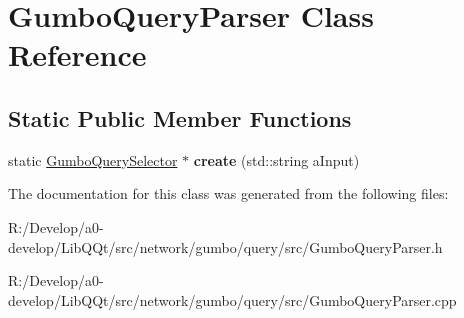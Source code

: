 \hypertarget{class_gumbo_query_parser}{}\section{Gumbo\+Query\+Parser Class Reference}
\label{class_gumbo_query_parser}
\subsection*{Static Public Member Functions}
\begin{DoxyCompactItemize}
\item 
\mbox{\label{class_gumbo_query_parser_aa52098b2bcb2c5b05866b9c9e88e2810}} 
static \mbox{\hyperlink{class_gumbo_query_selector}{Gumbo\+Query\+Selector}} $\ast$ {\bfseries create} (std\+::string a\+Input)
\end{DoxyCompactItemize}


The documentation for this class was generated from the following files\+:\begin{DoxyCompactItemize}
\item 
R\+:/\+Develop/a0-\/develop/\+Lib\+Q\+Qt/src/network/gumbo/query/src/Gumbo\+Query\+Parser.\+h\item 
R\+:/\+Develop/a0-\/develop/\+Lib\+Q\+Qt/src/network/gumbo/query/src/Gumbo\+Query\+Parser.\+cpp\end{DoxyCompactItemize}
